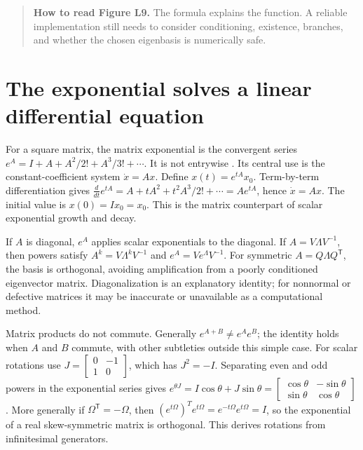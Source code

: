 \begin{quote}
\textbf{How to read Figure L9.} The formula explains the function. A reliable implementation still needs to consider conditioning, existence, branches, and whether the chosen eigenbasis is numerically safe.
\end{quote}

\section{The exponential solves a linear differential equation}\label{02-foundations-ii-ch026-the-exponential-solves-a-linear-differential-equation}

\hypertarget{02-foundations-ii-ch026-the-exponential-solves-a-linear-differential-equation}{}

For a square matrix, the matrix exponential is the convergent series \(e^A=I+A+A^2/2!+A^3/3!+\cdots\). It is not entrywise . Its central use is the constant-coefficient system \(\dot x=Ax\). Define \(x(t)=e^{tA}x_0\). Term-by-term differentiation gives \(\frac{d}{dt}e^{tA}=A+ tA^2+t^2A^3/2!+\cdots=Ae^{tA}\), hence \(\dot x=Ax\). The initial value is \(x(0)=Ix_0=x_0\). This is the matrix counterpart of scalar exponential growth and decay.

If \(A\) is diagonal, \(e^A\) applies scalar exponentials to the diagonal. If \(A=V\Lambda V^{-1}\), then powers satisfy \(A^k=V\Lambda^kV^{-1}\) and \(e^A=Ve^\Lambda V^{-1}\). For symmetric \(A=Q\Lambda Q^\mathsf T\), the basis is orthogonal, avoiding amplification from a poorly conditioned eigenvector matrix. Diagonalization is an explanatory identity; for nonnormal or defective matrices it may be inaccurate or unavailable as a computational method.

Matrix products do not commute. Generally \(e^{A+B}\ne e^Ae^B\); the identity holds when \(A\) and \(B\) commute, with other subtleties outside this simple case. For scalar rotations use \(J=\begin{bmatrix}0&-1\\1&0\end{bmatrix}\), which has \(J^2=-I\). Separating even and odd powers in the exponential series gives \(e^{\theta J}=I\cos\theta+J\sin\theta=\begin{bmatrix}\cos\theta&-\sin\theta\\\sin\theta&\cos\theta\end{bmatrix}\). More generally if \(\Omega^\mathsf T=-\Omega\), then \((e^{t\Omega})^Te^{t\Omega}=e^{-t\Omega}e^{t\Omega}=I\), so the exponential of a real skew-symmetric matrix is orthogonal. This derives rotations from infinitesimal generators.

